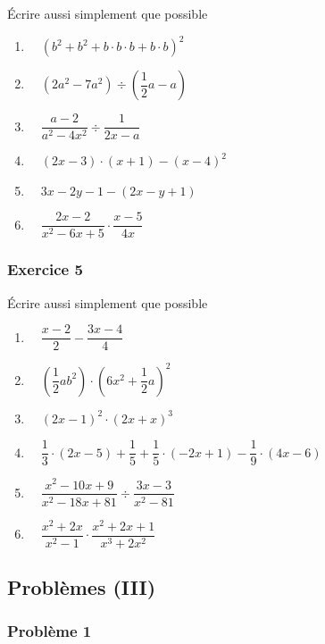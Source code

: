 \documentclass[
  12pt,
]{book}
\providecommand{\tightlist}{%
  \setlength{\itemsep}{0pt}\setlength{\parskip}{0pt}}
\begin{document}
Écrire aussi simplement que possible

\begin{enumerate}
\def\labelenumi{\arabic{enumi}.}
\tightlist
\item
  \(\quad (b^2+b^2+b\cdot b\cdot b+b\cdot b)^2\)
\item
  \(\quad (2a^2-7a^2)\div(\dfrac{1}{2}a-a)\)
\item
  \(\quad \dfrac{a-2}{a^2-4x^2}\div\dfrac{1}{2x-a}\)
\item
  \(\quad (2x-3)\cdot(x+1)-(x-4)^2\)
\item
  \(\quad 3x-2y-1-(2x-y+1)\)
\item
  \(\quad \dfrac{2x-2}{x^2-6x+5}\cdot\dfrac{x-5}{4x}\)
\end{enumerate}

\hypertarget{exercice-5-5}{%
\subsubsection*{Exercice 5}\label{exercice-5-5}}

Écrire aussi simplement que possible

\begin{enumerate}
\def\labelenumi{\arabic{enumi}.}
\tightlist
\item
  \(\quad \dfrac{x-2}{2}-\dfrac{3x-4}{4}\)
\item
  \(\quad \left(\dfrac{1}{2}ab^2\right)\cdot (6x^2+\dfrac{1}{2}a)^2\)
\item
  \(\quad (2x-1)^2\cdot(2x+x)^3\)
\item
  \(\quad \dfrac{1}{3}\cdot (2x-5)+\dfrac{1}{5}+\dfrac{1}{5}\cdot(-2x+1)-\dfrac{1}{9}\cdot(4x-6)\)
\item
  \(\quad \dfrac{x^2-10x+9}{x^2-18x+81}\div\dfrac{3x-3}{x^2-81}\)
\item
  \(\quad \dfrac{x^2+2x}{x^2-1}\cdot\dfrac{x^2+2x+1}{x^3+2x^2}\)
\end{enumerate}

\hypertarget{probluxe8mes-iii-2}{%
\subsection{Problèmes (III)}\label{probluxe8mes-iii-2}}

\hypertarget{probluxe8me-1-2}{%
\subsubsection*{Problème 1}\label{probluxe8me-1-2}}
\end{document}
